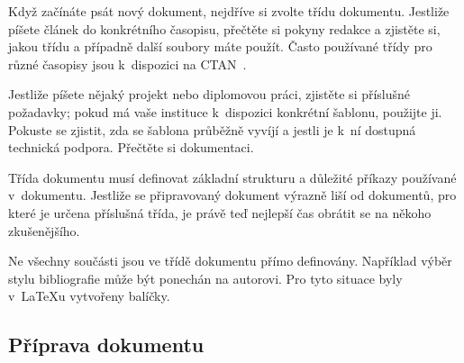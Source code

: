 \documentclass{csbulletin}
\begin{document}
Když začínáte psát nový dokument, nejdříve si zvolte třídu dokumentu. Jestliže píšete článek do konkrétního časopisu, přečtěte si pokyny redakce a zjistěte si, jakou třídu a případně další soubory máte použít. Často používané třídy pro různé časopisy jsou k~dispozici na CTAN~\cite{ctansearch}.

Jestliže píšete nějaký projekt nebo diplomovou práci, zjistěte si příslušné požadavky; pokud má vaše instituce k~dispozici konkrétní šablonu, použijte ji. Pokuste se zjistit, zda se šablona průběžně vyvíjí a jestli je k~ní dostupná technická podpora. Přečtěte si dokumentaci.

Třída dokumentu musí definovat základní strukturu a důležité příkazy používané v~dokumentu. Jestliže se připravovaný dokument výrazně liší od dokumentů, pro které je určena příslušná třída, je právě teď nejlepší čas obrátit se na někoho zkušenějšího.

Ne všechny součásti jsou ve třídě dokumentu přímo definovány. Například výběr stylu bibliografie může být ponechán na autorovi. Pro tyto situace byly v~\LaTeX u vytvořeny balíčky.

\subsection{Příprava dokumentu}
\end{document}
